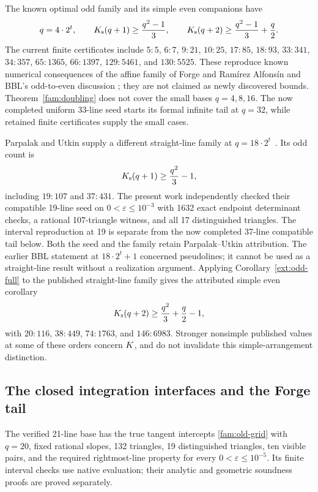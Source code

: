 The known optimal odd family and its simple even companions have
\begin{equation}
 q=4\cdot2^t,\qquad
 K_{\mathrm{s}}(q+1)\geq\frac{q^2-1}{3},\qquad
 K_{\mathrm{s}}(q+2)\geq\frac{q^2-1}{3}+\frac q2.
 \label{fam:tamura}
\end{equation}
The current finite certificates include
$5:5$, $6:7$, $9:21$, $10:25$, $17:85$, $18:93$, $33:341$,
$34:357$, $65:1365$, $66:1397$, $129:5461$, and $130:5525$.
These reproduce known numerical consequences of the affine family of
Forge and Ram\'irez Alfons\'in and BBL's odd-to-even discussion
\cite{forge1998,bbl2008}; they are not claimed as newly discovered
bounds. Theorem~\ref{fam:doubling} does not cover the small bases
$q=4,8,16$. The now completed uniform 33-line seed starts its formal
infinite tail at $q=32$, while retained finite certificates supply the
small cases.

Parpalak and Utkin supply a different straight-line family at
$q=18\cdot2^t$~\cite{parpalakutkin2026}.  Its odd count is
\begin{equation}
 K_{\mathrm{s}}(q+1)\geq\frac{q^2}{3}-1,
 \label{fam:pu}
\end{equation}
including $19:107$ and $37:431$.  The present work independently checked
their compatible 19-line seed on $0<\varepsilon\leq10^{-3}$ with 1632
exact endpoint determinant checks, a rational 107-triangle witness,
and all 17 distinguished triangles. The interval reproduction at 19
is separate from the now completed 37-line compatible tail below.
Both the seed and the family retain Parpalak--Utkin attribution.
The earlier BBL statement at $18\cdot2^t+1$ concerned pseudolines;
it cannot be used as a straight-line result without a realization
argument.  Applying Corollary~\ref{ext:odd-full} to the published
straight-line family gives the attributed simple even corollary
\[
 K_{\mathrm{s}}(q+2)\geq\frac{q^2}{3}+\frac q2-1,
\]
with $20:116$, $38:449$, $74:1763$, and $146:6983$.  Stronger nonsimple
published values at some of these orders concern $K$, and do not
invalidate this simple-arrangement distinction.

\subsection{The closed integration interfaces and the Forge tail}

The verified 21-line base has the true tangent intercepts
\eqref{fam:old-grid} with $q=20$, fixed rational slopes, 132 triangles,
19 distinguished triangles, ten visible pairs, and the required
rightmost-line property for every $0<\varepsilon\le10^{-5}$.
Its finite interval checks use native evaluation; their analytic and
geometric soundness proofs are proved separately.

